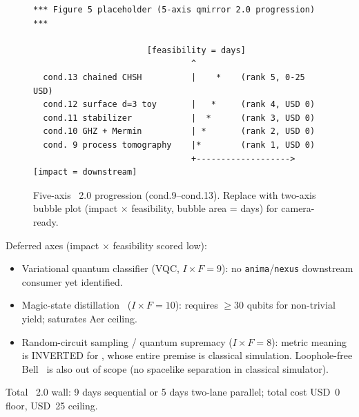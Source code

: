 \begin{figure}[htbp]
\centering
\begin{lstlisting}[basicstyle=\ttfamily\tiny,frame=single,framesep=4pt]
*** Figure 5 placeholder (5-axis qmirror 2.0 progression) ***

                       [feasibility = days]
                                ^
  cond.13 chained CHSH          |    *    (rank 5, 0-25 USD)
  cond.12 surface d=3 toy       |   *     (rank 4, USD 0)
  cond.11 stabilizer            |  *      (rank 3, USD 0)
  cond.10 GHZ + Mermin          | *       (rank 2, USD 0)
  cond. 9 process tomography    |*        (rank 1, USD 0)
                                +-------------------> [impact = downstream]
\end{lstlisting}
\caption{Five-axis \qmirror{}~2.0 progression (cond.9--cond.13).
Replace with two-axis bubble plot (impact $\times$ feasibility,
bubble area = days) for camera-ready.}
\label{fig:qmirror2_axes}
\end{figure}

Deferred axes (impact $\times$ feasibility scored low):

\begin{itemize}
\item Variational quantum classifier (VQC, $I\!\times\!F = 9$): no
  \texttt{anima}/\texttt{nexus} downstream consumer yet identified.
\item Magic-state distillation~\cite{Bravyi-Kitaev-2005}
  ($I\!\times\!F = 10$): requires $\ge 30$ qubits for non-trivial
  yield; saturates Aer ceiling.
\item Random-circuit sampling / quantum supremacy
  ($I\!\times\!F = 8$): metric meaning is INVERTED for \qmirror{},
  whose entire premise is classical simulation. Loophole-free
  Bell~\cite{Hensen-2015} is also out of scope (no spacelike
  separation in classical simulator).
\end{itemize}

Total \qmirror{}~2.0 wall: 9 days sequential or 5 days two-lane
parallel; total cost USD~0 floor, USD~25 ceiling.
